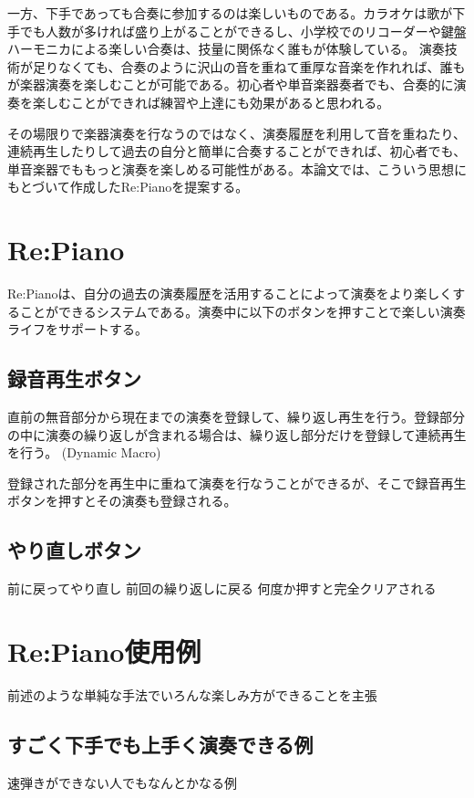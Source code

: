 \documentclass[submit,techreq]{ec2017}
\begin{document}
 一方、下手であっても合奏に参加するのは楽しいものである。カラオケは歌が下手でも人数が多ければ盛り上がることができるし、小学校でのリコーダーや鍵盤ハーモニカによる楽しい合奏は、技量に関係なく誰もが体験している。
演奏技術が足りなくても、合奏のように沢山の音を重ねて重厚な音楽を作れれば、誰もが楽器演奏を楽しむことが可能である。初心者や単音楽器奏者でも、合奏的に演奏を楽しむことができれば練習や上達にも効果があると思われる。

 その場限りで楽器演奏を行なうのではなく、演奏履歴を利用して音を重ねたり、連続再生したりして過去の自分と簡単に合奏することができれば、初心者でも、単音楽器でももっと演奏を楽しめる可能性がある。本論文では、こういう思想にもとづいて作成したRe:Pianoを提案する。

\section{Re:Piano}

Re:Pianoは、自分の過去の演奏履歴を活用することによって演奏をより楽しくすることができるシステムである。演奏中に以下のボタンを押すことで楽しい演奏ライフをサポートする。

\subsection{録音再生ボタン}
直前の無音部分から現在までの演奏を登録して、繰り返し再生を行う。登録部分の中に演奏の繰り返しが含まれる場合は、繰り返し部分だけを登録して連続再生を行う。 (Dynamic Macro)

登録された部分を再生中に重ねて演奏を行なうことができるが、そこで録音再生ボタンを押すとその演奏も登録される。

\subsection{やり直しボタン}
前に戻ってやり直し
    前回の繰り返しに戻る
   何度か押すと完全クリアされる

\section{Re:Piano使用例}

前述のような単純な手法でいろんな楽しみ方ができることを主張

\subsection{すごく下手でも上手く演奏できる例}
  速弾きができない人でもなんとかなる例
  
\end{document}
